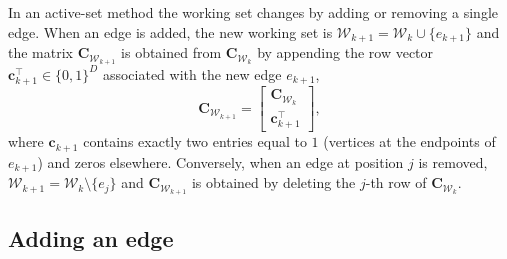 \documentclass[a4paper,12pt,openany]{book}
\newcommand{\C}{\mathbf{C}}
\renewcommand{\c}{\mathbf{c}}
\begin{document}
\begin{appendices}
In an active-set method the working set changes by adding or removing a single edge. When an edge is added, the new working set is $\mathcal{W}_{k+1}=\mathcal{W}_k\cup\{e_{k+1}\}$ and the matrix $\C_{\mathcal{W}_{k+1}}$ is obtained from $\C_{\mathcal{W}_k}$ by appending the row vector $\c_{k+1}^\top\in\{0,1\}^D$ associated with the new edge $e_{k+1}$,
\begin{equation}\label{eq:C_W_add}
\C_{\mathcal{W}_{k+1}} = \begin{bmatrix} \C_{\mathcal{W}_k} \\ \c_{k+1}^\top \end{bmatrix},
\end{equation}
where $\c_{k+1}$ contains exactly two entries equal to $1$ (vertices at the endpoints of $e_{k+1}$) and zeros elsewhere. Conversely, when an edge at position $j$ is removed, $\mathcal{W}_{k+1}=\mathcal{W}_k\setminus\{e_j\}$ and $\C_{\mathcal{W}_{k+1}}$ is obtained by deleting the $j$-th row of $\C_{\mathcal{W}_k}$. 

\subsection{Adding an edge}
\label{subsec:adding_edge}


\end{appendices}
\end{document}
